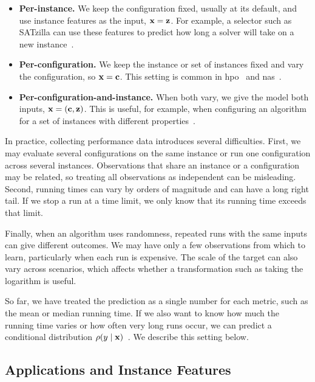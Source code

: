 \begin{itemize}
  \item \textbf{Per-instance.} We keep the configuration fixed, usually at its default, and use instance features as the input, $\mathbf{x} = \mathbf{z}$. For example, a selector such as SATzilla can use these features to predict how long a solver will take on a new instance~\citep{XuEtAl08}.
  \item \textbf{Per-configuration.} We keep the instance or set of instances fixed and vary the configuration, so $\mathbf{x} = \mathbf{c}$. This setting is common in \gls{hpo}~\citep{FeuEtAl19} and \gls{nas}~\citep{ElsEtAl19}.
  \item \textbf{Per-configuration-and-instance.} When both vary, we give the model both inputs, $\mathbf{x} = (\mathbf{c}, \mathbf{z})$. This is useful, for example, when configuring an algorithm for a set of instances with different properties~\citep{HutEtAl14,EggEtAl18}.
\end{itemize}

In practice, collecting performance data introduces several difficulties. First, we may evaluate several configurations on the same instance or run one configuration across several instances. Observations that share an instance or a configuration may be related, so treating all observations as independent can be misleading. Second, running times can vary by orders of magnitude and can have a long right tail. If we stop a run at a time limit, we only know that its running time exceeds that limit.

Finally, when an algorithm uses randomness, repeated runs with the same inputs can give different outcomes. We may have only a few observations from which to learn, particularly when each run is expensive. The scale of the target can also vary across scenarios, which affects whether a transformation such as taking the logarithm is useful.

So far, we have treated the prediction as a single number for each metric, such as the mean or median running time. If we also want to know how much the running time varies or how often very long runs occur, we can predict a conditional distribution $\rho(y \mid \mathbf{x})$~\citep{EggEtAl18a}. We describe this setting below.

\subsection{Applications and Instance Features}

